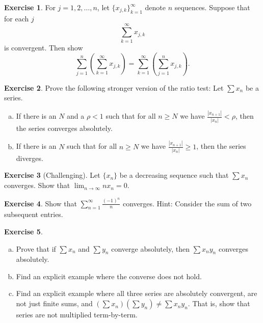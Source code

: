 \documentclass[12pt]{book}
\newcommand{\abs}[1]{\left\lvert {#1} \right\rvert}
\theoremstyle{plain}
\theoremstyle{remark}
\theoremstyle{definition}
\theoremstyle{exercise}
\newtheorem{exercise}{Exercise}[section]
\theoremstyle{example}
\begin{document}
\begin{exercise}
For $j=1,2,\ldots,n$, let $\{ x_{j,k} \}_{k=1}^\infty$ denote $n$
sequences.  Suppose that for each $j$
\begin{equation*}
\sum_{k=1}^\infty x_{j,k}
\end{equation*}
is convergent.  Then show
\begin{equation*}
\sum_{j=1}^n \left( \sum_{k=1}^\infty x_{j,k} \right)
=
\sum_{k=1}^\infty \left( \sum_{j=1}^n x_{j,k} \right) .
\end{equation*}
\end{exercise}

\begin{exercise}
Prove the following stronger version of the ratio test:
Let $\sum x_n$ be a series.
\begin{enumerate}[a)]
\item
If there is an $N$ and a $\rho < 1$ such that for
all $n \geq N$ we have
$\frac{\abs{x_{n+1}}}{\abs{x_n}} < \rho$, then
the series converges absolutely.
\item
If there is an $N$ such that for
all $n \geq N$ we have
$\frac{\abs{x_{n+1}}}{\abs{x_n}} \geq 1$, then
the series diverges. 
\end{enumerate}
\end{exercise}

\begin{exercise}[Challenging]
Let $\{ x_n \}$ be a decreasing sequence such that $\sum x_n$ converges.  Show
that $\displaystyle \lim_{n\to\infty} n x_n = 0$.
\end{exercise}

\begin{exercise}
Show that $\displaystyle \sum_{n=1}^\infty \frac{{(-1)}^n}{n}$ converges.
Hint: Consider the sum of two subsequent entries.
\end{exercise}

\begin{exercise}
{\ }
\begin{enumerate}[a)]
\item Prove that if $\sum x_n$ and $\sum y_n$ converge absolutely, then
$\sum x_ny_n$ converges absolutely.
\item Find an explicit example where the converse does not hold.
\item Find an explicit example where all three series are absolutely convergent,
are not just finite sums,
and $(\sum x_n)(\sum y_n) \not= \sum x_ny_n$.  That is, show that series are
not multiplied term-by-term.
\end{enumerate}
\end{exercise}
\end{document}
